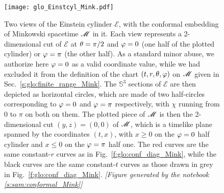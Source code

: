 \begin{figure}
\centerline{\texttt{[image: glo\_Einstcyl\_Mink.pdf]}}
\caption[]{\label{f:glo:Einstcyl_Mink}\footnotesize
Two views of the Einstein cylinder $\mathscr{E}$, with the conformal embedding of
Minkowski spacetime $\mathscr{M}$ in it. Each view represents a 2-dimensional cut of $\mathscr{E}$
at $\theta=\pi/2$ and $\varphi=0$ (one half of the plotted cylinder) or $\varphi=\pi$ (the other half).
As a standard minor abuse, we authorize here $\varphi=0$ as a valid coordinate value, while we
had excluded it from the definition of the chart $(t,r,\theta,\varphi)$ on $\mathscr{M}$ given
in Sec.~\ref{s:glo:finite_range_Mink}.
The $\mathbb{S}^3$ sections of $\mathscr{E}$ are then depicted as horizontal circles,
which are made of two half-circles corresponding to $\varphi=0$ and $\varphi=\pi$
respectively, with $\chi$ running from $0$ to $\pi$ on both on them.
The plotted piece of $\mathscr{M}$ is then the
2-dimensional cut $(y,z) = (0,0)$ of $\mathscr{M}$, which is a timelike plane spanned
by the coordinates $(t,x)$, with $x\geq 0$ on the $\varphi=0$ half cylinder
and $x\leq 0$ on the $\varphi=\pi$ half one.
The red curves are the same constant-$r$ curves
as in Fig.~\ref{f:glo:conf_diag_Mink}, while the black curves are
the same constant-$t$ curves as those drawn in grey in Fig.~\ref{f:glo:conf_diag_Mink}.
\textsl{[Figure generated by the notebook \ref{s:sam:conformal_Mink}]}
}
\end{figure}

